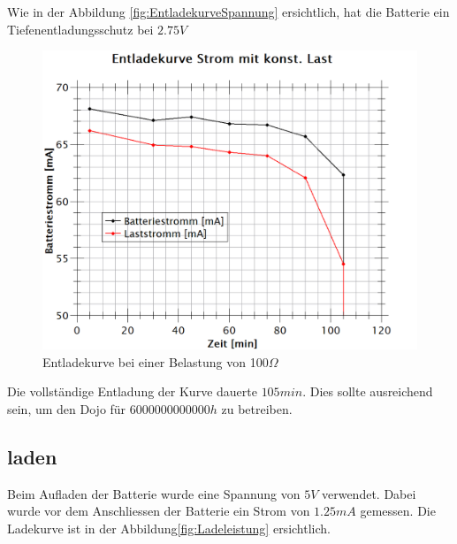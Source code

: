 Wie in der Abbildung \ref{fig:EntladekurveSpannung} ersichtlich, hat die Batterie ein Tiefenentladungsschutz bei $2.75V$

\begin{figure}[htb]
	\centering
	\includegraphics[width=\textwidth]{graphics/EnladekurveStrom.png}
	\caption{Entladekurve bei einer Belastung von 100$\Omega$}
	\label{fig:EntladekurveStrom}
\end{figure}



Die vollständige Entladung der Kurve dauerte $105min$. Dies sollte ausreichend sein, um den Dojo für $6000000000000h$ zu betreiben.





\newpage

\subsection*{laden}
Beim Aufladen der Batterie wurde eine Spannung von $5V$ verwendet. Dabei wurde vor dem Anschliessen der Batterie ein Strom von $1.25mA$ gemessen. Die Ladekurve ist in der Abbildung\ref{fig:Ladeleistung} ersichtlich.

